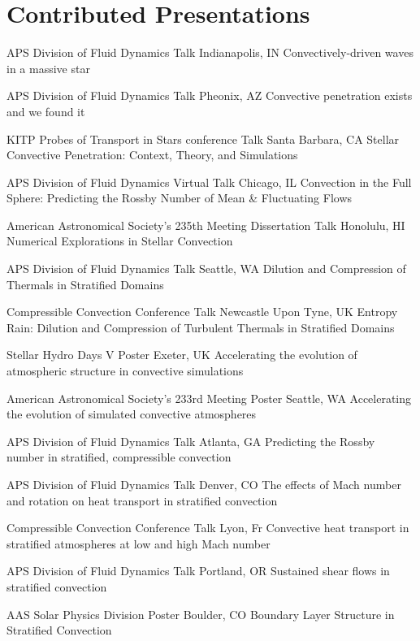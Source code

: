 \section{Contributed Presentations}

		{APS Division of Fluid Dynamics}
		{Talk}
		{Indianapolis, IN}
		{}
		{Convectively-driven waves in a massive star}

		{APS Division of Fluid Dynamics}
		{Talk}
		{Pheonix, AZ}
		{}
		{Convective penetration exists and we found it}


\cventry{}
		{KITP Probes of Transport in Stars conference}
		{Talk}
		{Santa Barbara, CA}
		{}
		{Stellar Convective Penetration: Context, Theory, and Simulations}

		{APS Division of Fluid Dynamics}
		{Virtual Talk}
		{Chicago, IL}
		{}
		{Convection in the Full Sphere: Predicting the Rossby Number of Mean \& Fluctuating Flows}


\cventry{}
		{American Astronomical Society's 235th Meeting}
		{Dissertation Talk}
		{Honolulu, HI}
		{}
		{Numerical Explorations in Stellar Convection}

		{APS Division of Fluid Dynamics}
		{Talk}
		{Seattle, WA}
		{}
		{Dilution and Compression of Thermals in Stratified Domains}

\cventry{}
		{Compressible Convection Conference}
		{Talk}
		{Newcastle Upon Tyne, UK}
		{}
		{Entropy Rain: Dilution and Compression of Turbulent Thermals in Stratified Domains}

\cventry{}
		{Stellar Hydro Days V}
		{Poster}
		{Exeter, UK}
		{}
		{Accelerating the evolution of atmospheric structure in convective simulations}

\cventry{}
		{American Astronomical Society's 233rd Meeting}
		{Poster}
		{Seattle, WA}
		{}
		{Accelerating the evolution of simulated convective atmospheres}

		{APS Division of Fluid Dynamics}
		{Talk}
		{Atlanta, GA}
		{}
		{Predicting the Rossby number in stratified, compressible convection}

		{APS Division of Fluid Dynamics}
		{Talk}
		{Denver, CO}
		{}
		{The effects of Mach number and rotation on heat transport in stratified convection}

\cventry{}
		{Compressible Convection Conference}
		{Talk}
		{Lyon, Fr}
		{}
		{Convective heat transport in stratified atmospheres at low and high Mach number}

		{APS Division of Fluid Dynamics}
		{Talk}
		{Portland, OR}
		{}
		{Sustained shear flows in stratified convection}

\cventry{}
		{AAS Solar Physics Division}
		{Poster}
		{Boulder, CO}
		{}
		{Boundary Layer Structure in Stratified Convection}

